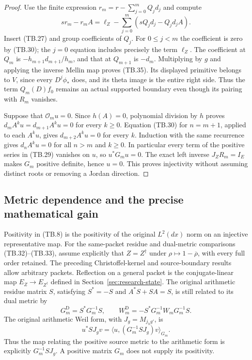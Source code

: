 \begin{proof}
Use the finite expression
\(r_m=r-\sum_{j=0}^mQ_jd_j\) and compute
\[
 sr_m-r_mA
 =\ell_Z-\sum_{j=0}^m(sQ_jd_j-Q_jd_jA).
\]
Insert (TB.27) and group coefficients of \(Q_j\).
For \(0\leq j<m\) the coefficient is zero by (TB.30);
the \(j=0\) equation includes precisely the term \(\ell_Z\).
The coefficient at \(Q_m\) is
\(-h_{m+1}d_{m+1}/h_m\), and that at \(Q_{m+1}\) is
\(-d_m\).  Multiplying by \(g\) and applying the inverse
Mellin map proves (TB.35).  Its displayed primitive belongs
to \(V\), since every \(D^j\phi_*\) does, and its theta
image is the entire right side.  Thus the term \(Q_m(D)f_0\)
remains an actual supported boundary even though its pairing
with \(R_m\) vanishes.

Suppose that \(\mathcal O_mu=0\).  Since \(h(A)=0\),
polynomial division by \(h\) proves
\(d_mA^ku=d_{m+1}A^ku=0\) for every \(k\geq0\).
Equation (TB.30) for \(n=m+1\), applied to each \(A^ku\),
gives \(d_{m+2}A^ku=0\) for every \(k\).
Induction with the same recurrence gives
\(d_nA^ku=0\) for all \(n>m\) and \(k\geq0\).
In particular every term of the positive series in (TB.29)
vanishes on \(u\), so \(u^*G_mu=0\).
The exact left inverse \(J_ZR_m=I_E\) makes \(G_m\)
positive definite, hence \(u=0\).
This proves injectivity without assuming distinct roots
or removing a Jordan direction.
\end{proof}

\subsection{Metric dependence and the precise mathematical gain}

Positivity in (TB.8) is the positivity of the original
\(L^2(dx)\) norm on an injective representative map.
For the same-packet residue and dual-metric comparisons
(TB.32)--(TB.33), assume explicitly that
\(Z=Z^\dagger\) under \(\rho\mapsto1-\overline\rho\),
with every full order retained. The preceding Christoffel-kernel
and source-boundary results allow arbitrary packets. Reflection
on a general packet is the conjugate-linear map
\(E_Z\to E_{Z^\dagger}\) defined in Section~\ref{sec:research-state}.
The original arithmetic residue matrix \(S\), satisfying
\(S^*=-S\) and \(A^*S+SA=S\), is still related to its dual metric by
\[
 G_m^{\mathrm D}=S^*G_m^{-1}S,\qquad
 W_m^{\mathrm D}=-S^*G_m^{-1}W_mG_m^{-1}S.
 \tag{TB.32}
\]
The original arithmetic Weil form, with \(J_g=M_{j_hg'}\), is
\[
 u^*SJ_gv=\langle u,(G_m^{-1}SJ_g)v\rangle_{G_m}.
 \tag{TB.33}
\]
Thus the map relating the positive source metric to the arithmetic
form is explicitly \(G_m^{-1}SJ_g\).  A positive matrix
\(G_m\) does not supply its positivity.


